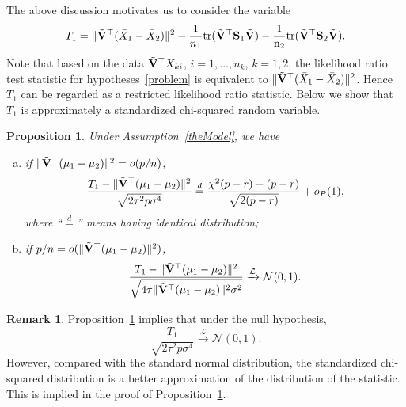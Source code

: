 \documentclass[times,sort&compress,3p]{elsarticle}
\newcommand{\mytr}{\rm tr}
\theoremstyle{plain}
\newtheorem{proposition}{\quad\quad Proposition}
\theoremstyle{definition}
\newtheorem{remark}{\quad\quad Remark}
\theoremstyle{remark}
\begin{document}
The above discussion motivates us to consider the variable
\begin{equation*}
\begin{aligned}
    T_1=\|\tilde{\BV}^\top (\bar{X}_1-\bar{X}_2)\|^2-\frac{1}{n_1}\mytr(\tilde{\BV}^\top  \BS_1\tilde{\BV})-\frac{1}{n_2}\mytr(\tilde{\BV}^\top  \BS_2\tilde{\BV}).
    \\
\end{aligned}
\end{equation*}
 Note that based on the data $\tilde{\mathbf{V}}^\top  X_{ki}$, $i=1,\ldots,n_k$, $k=1,2$, the likelihood ratio test statistic for hypotheses~\eqref{problem} is equivalent to 
    $\|\tilde{\mathbf{V}}^\top  (\bar{X}_1-\bar{X}_2)\|^2$. 
Hence $T_1$ can be regarded as a restricted likelihood ratio statistic.
Below we show that $T_1$ is approximately a standardized chi-squared random variable.
\begin{proposition}\label{oracleTheorem}
    Under Assumption~\ref{theModel}, we have 
    \begin{enumerate}[(a)]
\item
    if $\|\tilde{\mathbf{V}}^\top (\mu_1-\mu_2)\|^2= o(p/n)$,
    \begin{equation}\label{oracleTheoremR1}
        \frac{T_1-\|\tilde{\BV}^\top (\mu_1-\mu_2)\|^2}
        {\sqrt{2\tau^2 p\sigma^4}}%
        \overset{d}{=} \frac{\chi^2(p-r)-(p-r)}{\sqrt{2(p-r)}}+o_P(1),
    \end{equation}
where ``$\overset{d}{=}$'' means having identical distribution;
\item
    if $p/n= o(\|\tilde{\mathbf{V}}^\top (\mu_1-\mu_2)\|^2)$, 
    \begin{equation}\label{oracleTheoremR2}
        \frac{T_1-\|\tilde{\mathbf{V}}^\top (\mu_1-\mu_2)\|^2}
        {\sqrt{4\tau\|\tilde{\mathbf{V}}^\top (\mu_1-\mu_2)\|^2\sigma^2}}\xrightarrow{\mathcal{L}}\mathcal{N}(0,1).
    \end{equation}
    \end{enumerate}
\end{proposition}
\begin{remark}
    Proposition~\ref{oracleTheorem} implies that under the null hypothesis,
    $$
        \frac{T_1}
        {\sqrt{2\tau^2 p\sigma^4}}\xrightarrow{\mathcal{L}}\mathcal{N}(0,1).
    $$
    However, compared with the standard normal distribution, the standardized chi-squared distribution is a better approximation of the distribution of the statistic.
    This is implied in the proof of Proposition~\ref{oracleTheorem}.
\end{remark}
\end{document}
